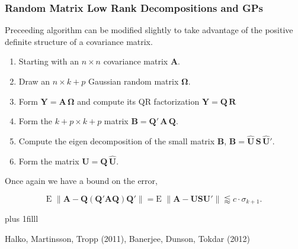 \documentclass[t]{beamer}\usepackage[]{graphicx}\usepackage[]{color}
\newcommand{\vvfill}{\vskip0pt plus 1filll}
\begin{document}
\begin{frame}
\frametitle{Random Matrix Low Rank Decompositions and GPs}

Preceeding algorithm can be modified slightly to take advantage of the positive definite structure of a covariance matrix.

\begin{enumerate}
\item Starting with an $n \times n$ covariance matrix $\bm{A}$.
\item Draw an $n \times k+p$ Gaussian random matrix $\bm{\Omega}$.
\item Form $\bm{Y} = \bm{A}\,\bm{\Omega}$ and compute its QR factorization $\bm{Y} = \bm{Q}\,\bm{R}$
\item Form the $k+p \times k+p$ matrix $\bm{B}=\bm{Q}'\,\bm{A} \, \bm{Q}$.
\item Compute the eigen decomposition of the small matrix $\bm{B}$, $\bm{B} = \bm{\hat{U}}\,\bm{S}\,\bm{\hat{U}}'$.
\item Form the matrix $\bm{U} = \bm{Q} \, \bm{\hat{U}}$.
\end{enumerate}

Once again we have a bound on the error,

\[
   \text{E } \| \bm{A} - \bm{Q}(\bm{Q}'\bm{A}\bm{Q})\bm{Q}'\| 
 = \text{E } \| \bm{A} - \bm{U}\bm{S}\bm{U}'\| 
\lessapprox c \cdot \sigma_{k+1}. 
\]

\vvfill

{\footnotesize
\begin{center}
Halko, Martinsson, Tropp (2011), Banerjee, Dunson, Tokdar (2012)
\end{center}
}

\end{frame}


\end{document}
